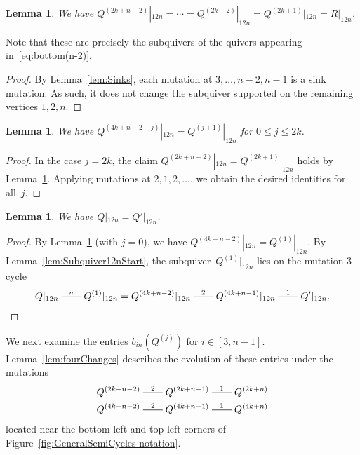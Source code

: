 \documentclass[11pt, letterpaper]{amsart}
\newtheorem{lemma}[theorem]{Lemma}
\theoremstyle{definition}
\numberwithin{equation}{section}
\newcommand{\mutation}[1]{\stackrel{#1}{\rule[.5ex]{2em}{0.5pt}}}
\begin{document}
\begin{lemma}
\label{lem:Subquiver12nBottom}
We have 
$Q^{(2k+n-2)}|_{12n}=\cdots =
Q^{(2k+2)}|_{12n} = Q^{(2k+1)}|_{12n} = R|_{12n}$. 
\end{lemma}

Note that these are precisely the subquivers of the quivers appearing in~\eqref{eq:bottom(n-2)}. 

\begin{proof}
By Lemma~\ref{lem:Sinks}, each mutation at $3,\dots,n-2,n-1$ is a sink mutation.
As such, it does not change the subquiver supported on the remaining vertices $1,2,n$. 
\end{proof}

\begin{lemma}
\label{lem:Subquiver12nLeft}
We have $Q^{(4k+n-2-j)}|_{12n} = Q^{(j+1)}|_{12n}$ for $ 0 \leq j \leq 2k$.
\end{lemma}

\begin{proof}
In the case $j=2k$, the claim
$Q^{(2k+n-2)}|_{12n}=Q^{(2k+1)}|_{12n}$ holds by Lemma~\ref{lem:Subquiver12nBottom}. %
Applying mutations at $2, 1, 2,\dots$, we obtain the desired identities for all~$j$. 
\end{proof}

\begin{lemma}
\label{lem:Subquiver12n}
We have $Q|_{12n} = Q'|_{12n}$.
\end{lemma}

\begin{proof}
By Lemma~\ref{lem:Subquiver12nLeft} (with $j=0$), we have $Q^{(4k+n-2)}|_{12n} = Q^{(1)}|_{12n}$. By Lemma~\ref{lem:Subquiver12nStart}, the subquiver~$Q^{(1)}|_{12n}$ lies on the mutation 3-cycle 
\begin{equation*}
Q|_{12n} \mutation{n} Q^{(1)}|_{12n} = Q^{(4k+n-2)}|_{12n}
\mutation{2} Q^{(4k+n-1)}|_{12n} \mutation{1} Q'|_{12n}. \qedhere
\end{equation*}
\end{proof}

We next examine the entries $b_{in}(Q^{(j)})$ for $i\in [3,n-1]$. 
Lemma~\ref{lem:fourChanges} describes the evolution of these entries under the mutations
\begin{align*}
Q^{(2k+n-2)} \mutation{2}Q^{(2k+n-1)}\mutation{1}Q^{(2k+n)} \\
Q^{(4k+n-2)} \mutation{2}Q^{(4k+n-1)}\mutation{1}Q^{(4k+n)}
\end{align*}
located near the bottom left and top left corners of %
Figure~\ref{fig:GeneralSemiCycles-notation}.
\end{document}
